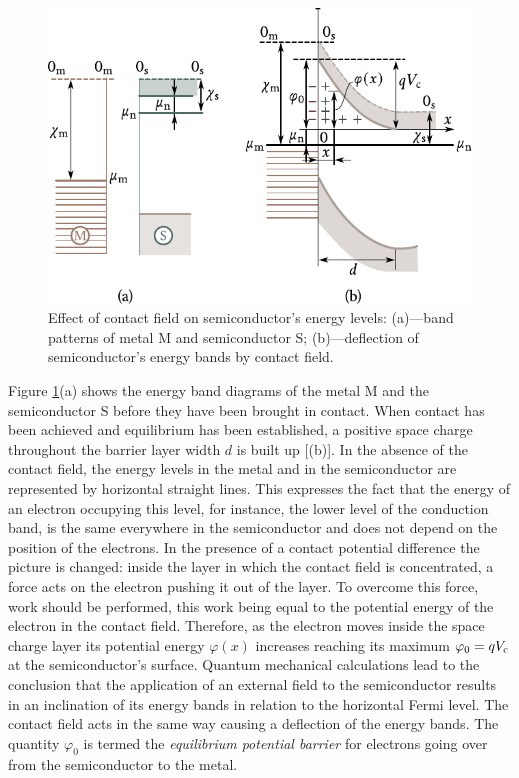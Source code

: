 \begin{figure}[t]
	\begin{center}
		\includegraphics[scale=1]{figures/ch_08/fig_8_7.pdf}
		\caption[]{Effect of contact field on semiconductor's energy levels: (a)---band patterns of metal M and semiconductor S; (b)---deflection of semiconductor's energy bands by contact field.}
		\label{fig:8_7}
	\end{center}
	\vspace{-0.8cm}
\end{figure}

Figure \ref{fig:8_7}(a) shows the energy band diagrams of the metal M and the semiconductor S before they have been brought in contact. When contact has been achieved and equilibrium has been established, a positive space charge throughout the barrier layer width $d$ is built up [(b)]. In the absence of the contact field, the energy levels in the metal and in the semiconductor are represented by horizontal straight lines. This expresses the fact that the energy of an electron occupying this level, for instance, the lower level of the conduction band, is the same everywhere in the semiconductor and does not depend on the position of the electrons. In the presence of a contact potential difference the picture is changed: inside the layer in which the contact field is concentrated, a force acts on the electron pushing it out of the layer. To overcome this force, work should be performed, this work being equal to the potential energy of the electron in the contact field. Therefore, as the electron moves inside the space charge layer its potential energy $\varphi(x)$ increases reaching its maximum $\varphi_0=qV_{\text{c}}$ at the semiconductor's surface. Quantum mechanical calculations lead to the conclusion that the application of an external field to the semiconductor results in an inclination of its energy bands in relation to the horizontal Fermi level. The contact field acts in the same way causing a deflection of the energy bands. The quantity $\varphi_0$ is termed the \textit{equilibrium potential barrier} for electrons
going over from the semiconductor to the metal.

